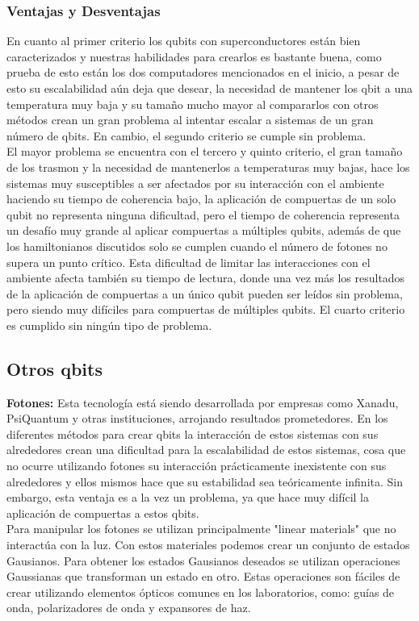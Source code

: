 \subsubsection{Ventajas y Desventajas}

En cuanto al primer criterio los qubits con superconductores están bien caracterizados y nuestras habilidades para crearlos es bastante buena, como prueba de esto están los dos computadores mencionados en el inicio, a pesar de esto su escalabilidad aún deja que desear, la necesidad de mantener los qbit a una temperatura muy baja y su tamaño mucho mayor al compararlos con otros métodos crean un gran problema al intentar escalar a sistemas de un gran número de qbits. En cambio, el segundo criterio se cumple sin problema.\\
El mayor problema se encuentra con el tercero y quinto criterio, el gran tamaño de los trasmon y la necesidad de mantenerlos a temperaturas muy bajas, hace los sistemas muy susceptibles a ser afectados por su interacción con el ambiente haciendo su tiempo de coherencia bajo, la aplicación de compuertas de un solo qubit no representa ninguna dificultad, pero el tiempo de coherencia representa un desafío muy grande al aplicar compuertas a múltiples qubits, además de que los hamiltonianos discutidos solo se cumplen cuando el número de fotones no supera un punto crítico. Esta dificultad de limitar las interacciones con el ambiente afecta también su tiempo de lectura, donde una vez más los resultados de la aplicación de compuertas a un único qubit pueden ser leídos sin problema, pero siendo muy difíciles para compuertas de múltiples qubits. El cuarto criterio es cumplido sin ningún tipo de problema.\\

\subsection{Otros qbits}

\textbf{Fotones:} Esta tecnología está siendo desarrollada por empresas como Xanadu, PsiQuantum y otras instituciones, arrojando resultados prometedores. En los diferentes métodos para crear qbits la interacción de estos sistemas con sus alrededores crean una dificultad para la escalabilidad de estos sistemas, cosa que no ocurre utilizando fotones su interacción prácticamente inexistente con sus alrededores y ellos mismos hace que su estabilidad sea teóricamente infinita. Sin embargo, esta ventaja es a la vez un problema, ya que hace muy difícil la aplicación de compuertas a estos qbits.\\
Para manipular los fotones se utilizan principalmente "linear materials" que no interactúa con la luz. Con estos materiales podemos crear un conjunto de estados Gausianos. Para obtener los estados Gausianos deseados se utilizan operaciones Gaussianas que transforman un estado en otro. Estas operaciones son fáciles de crear utilizando elementos ópticos comunes en los laboratorios, como:
guías de onda, polarizadores de onda y expansores de haz.\\

